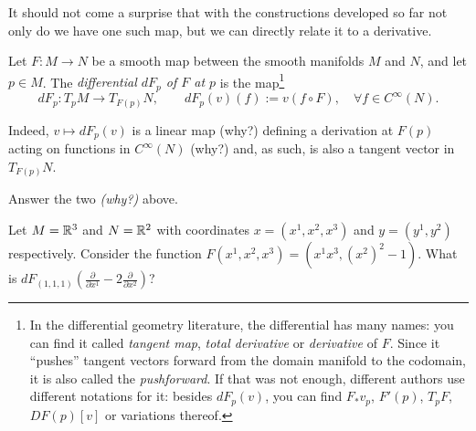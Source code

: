 It should not come a surprise that with the constructions developed so far not only do we have one such map, but we can directly relate it to a derivative.

\begin{definition}\label{def:differentialMap}
  Let $F: M \to N$ be a smooth map between the smooth manifolds $M$ and $N$, and let $p\in M$.
  The \emph{differential $d F_p$ of $F$ at $p$} is the map\footnote{In the differential geometry literature, the differential has many names: you can find it called \emph{tangent map}, \emph{total derivative} or \emph{derivative} of $F$.
    Since it ``pushes'' tangent vectors forward from the domain manifold to the codomain, it is also called the \emph{pushforward}. If that was not enough, different authors use different notations for it: besides $dF_p(v)$, you can find $F_* v_p$, $F'(p)$, $T_pF$, $DF(p)[v]$ or variations thereof.}
  \begin{equation}
    d F_p : T_p M \to T_{F(p)} N, \qquad d F_p (v) (f) := v(f\circ F), \quad \forall f\in C^\infty(N).
  \end{equation}
\end{definition}

Indeed, $v \mapsto d F_p (v)$ is a linear map (why?) defining a derivation at $F(p)$ acting on functions in $C^\infty(N)$ (why?) and, as such, is also a tangent vector in $T_{F(p)}N$.

\begin{exercise}
  Answer the two \emph{(why?)} above.
\end{exercise}
\begin{exercise}
  Let $M = \mathbb{R}^3$ and $N = \mathbb{R}^2$ with coordinates $x=(x^1,x^2,x^3)$ and $y=(y^1,y^2)$ respectively.
  Consider the function $F(x^1,x^2,x^3) = (x^1 x^3, (x^2)^2-1)$.
  What is $d F_{(1,1,1)} \left(\frac{\partial}{\partial x^1} - 2 \frac{\partial}{\partial x^2}\right)$?
\end{exercise}

